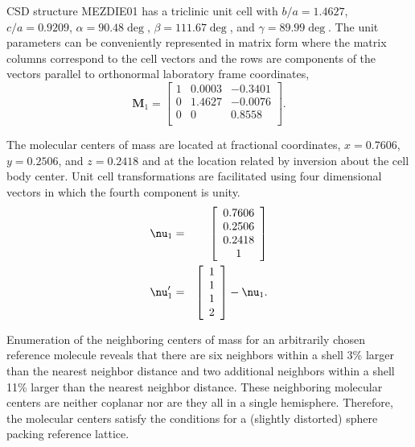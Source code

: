 \documentclass[preprint]{iucr}              %
\begin{document}
CSD structure MEZDIE01 has a triclinic unit cell with $b/a=1.4627$, $c/a=0.9209$, $\alpha=90.48\deg$, $\beta=111.67\deg$, and $\gamma=89.99\deg$.  The unit parameters can be conveniently represented in matrix form where the matrix columns correspond to the cell vectors and the rows are components of the vectors parallel to orthonormal laboratory frame coordinates,
\begin{equation}
   \mathbf{M}_1=\left[
     \begin{array}{ccc}
        1& 0.0003& -0.3401\\
        0& 1.4627& -0.0076\\
        0& 0& 0.8558\\
     \end{array}
  \right].
\end{equation}

The molecular centers of mass are located at fractional coordinates, $x=0.7606$, $y=0.2506$, and $z=0.2418$ and at the location related by inversion about the cell body center.  Unit cell transformations are facilitated using four dimensional vectors in which the fourth component is unity.
\begin{eqnarray}
   \mbox{\boldmath$\nu$}_1&=&\left[
     \begin{array}{c}
        0.7606\\
        0.2506\\
        0.2418\\
        1\\
     \end{array}
  \right]\\
   \mbox{\boldmath$\nu$}^\prime_1&=&\left[
     \begin{array}{c}
        1\\
        1\\
        1\\
        2\\
     \end{array}
  \right]-\mbox{\boldmath$\nu$}_1.
\end{eqnarray}

Enumeration of the neighboring centers of mass for an arbitrarily chosen reference molecule reveals that there are six neighbors within a shell 3\% larger than the nearest neighbor distance and two additional neighbors within a shell 11\% larger than the nearest neighbor distance.  These neighboring molecular centers are neither coplanar nor are they all in a single hemisphere.  Therefore, the molecular centers satisfy the conditions for a (slightly distorted) sphere packing reference lattice.
\end{document}
